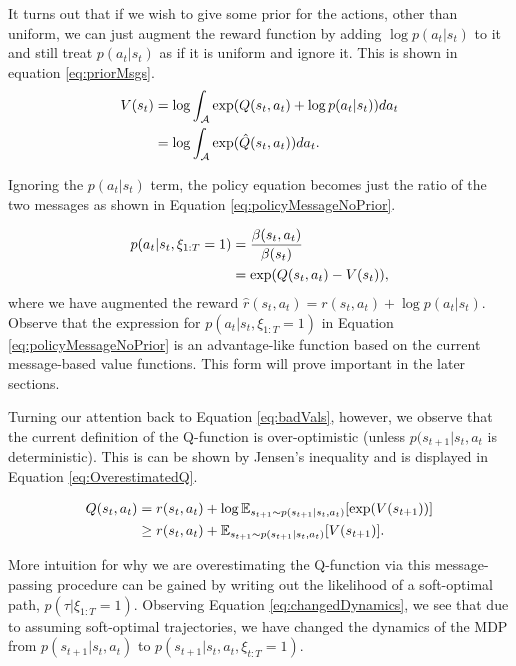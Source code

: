 \documentclass{report}
\numberwithin{equation}{section}
\numberwithin{figure}{section}
\numberwithin{table}{section}
\numberwithin{algorithm}{section}
\begin{document}
It turns out that if we wish to give some prior for the actions, 
other than uniform, we can just augment the reward function 
by adding $\log p(a_t|s_t)$ to it and still treat $p(a_t|s_t)$ 
as if it is uniform and ignore it. This is shown in equation 
\ref{eq:priorMsgs}.
\begin{align}\label{eq:priorMsgs}
  V(s_t)&=\log \int_{\mathcal{A}}\exp (Q(s_t, a_t) + \log p(a_t|s_t))da_t\notag\\
  &=\log \int_{\mathcal{A}}\exp (\hat{Q}(s_t, a_t))da_t.
\end{align}

Ignoring the $p(a_t|s_t)$ term, 
the policy equation becomes just the ratio 
of the two messages as shown in Equation \ref{eq:policyMessageNoPrior}.

\begin{align}\label{eq:policyMessageNoPrior}
  p(a_t|s_t, \xi_{1:T}=1)&=\frac{\beta(s_t, a_t)}{\beta(s_t)}\notag\\
  &=\exp(Q(s_t, a_t) - V(s_t)),
\end{align}
where we have augmented the reward $\hat{r}(s_t, a_t)=r(s_t,a_t) + \log p(a_t|s_t)$.
Observe that the expression for $p(a_t|s_t,\xi_{1:T}=1)$ in Equation 
\ref{eq:policyMessageNoPrior} is an advantage-like function based on 
the current message-based value functions. This form will prove 
important in the later sections.

Turning our attention back to Equation \ref{eq:badVals}, however, 
we observe that the current definition of the Q-function is 
over-optimistic (unless $p(s_{t+1}|s_t,a_t$ is deterministic). 
This is can be shown by Jensen's inequality and 
is displayed in Equation \ref{eq:OverestimatedQ}.

\begin{align}\label{eq:OverestimatedQ}
  Q(s_t,a_t)&=r(s_t, a_t) + \log\mathbb{E}_{s_{t+1}\sim p(s_{t+1}|s_t, a_t)}[\exp (V(s_{t+1}))]\notag\\
  &\ge r(s_t, a_t) + \mathbb{E}_{s_{t+1}\sim p(s_{t+1}|s_t, a_t)}[V(s_{t+1})].
\end{align}

More intuition for why we are overestimating the Q-function 
via this message-passing procedure can be gained by writing 
out the likelihood of a soft-optimal path, $p(\tau|\xi_{1:T}=1)$. 
Observing Equation \ref{eq:changedDynamics}, we see that due to 
assuming soft-optimal trajectories, we have changed the dynamics 
of the MDP from $p(s_{t+1}|s_t, a_t)$ to 
$p(s_{t+1}| s_t,a_t,\xi_{t:T}=1)$.
\end{document}
